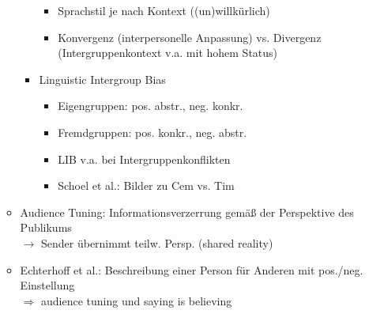 \documentclass[11pt, paper=a4, twocolumn]{scrartcl}
\begin{document}
\begin{itemize}
\begin{itemize}
\begin{itemize}
								\begin{itemize}
									\item Sprachstil je nach Kontext ((un)willkürlich)
									\item Konvergenz (interpersonelle Anpassung) vs. Divergenz (Intergruppenkontext 
										v.a. mit hohem Status)
								\end{itemize}
							\item Linguistic Intergroup Bias
								\begin{itemize}
									\item Eigengruppen: pos. abstr., neg. konkr.
									\item Fremdgruppen: pos. konkr., neg. abstr.
									\item LIB v.a. bei Intergruppenkonflikten
									\item Schoel et al.: Bilder zu Cem vs. Tim
								\end{itemize}
						\end{itemize}
					\item Audience Tuning: Informationsverzerrung gemäß der Perspektive des Publikums\\
						$\rightarrow$ Sender übernimmt teilw. Persp. (shared reality)
					\item Echterhoff et al.: Beschreibung einer Person für Anderen mit pos./neg. Einstellung\\
						$\Rightarrow$ audience tuning und saying is believing
				\end{itemize}
		\end{itemize}
\end{document}
